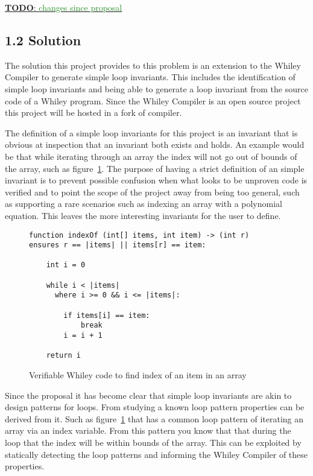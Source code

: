 \documentclass[11pt, a4paper, twoside, openright]{report}
\newcommand{\todo}[1]{\huge{\underline{\textbf{\textcolor{RubineRed}{TODO}}: \textcolor{ForestGreen}{#1}}}\normalsize }
\begin{document}
\todo{changes since proposal}

\subsection*{1.2 Solution}

The solution this project provides to this problem is an extension to
the Whiley Compiler to generate simple loop invariants.
This includes the identification of simple loop invariants and being able
to generate a loop invariant from the source code of a Whiley program.
Since the Whiley Compiler is an open source project this project will be
hosted in a fork of compiler.

The definition of a simple loop invariants for this project is an invariant that is
obvious at inspection that an invariant both exists and holds.
An example would be that while iterating through an array the index
will not go out of bounds of the array, such as figure~\ref{lst:whiley-ex-1}.
The purpose of having a strict definition of an simple invariant is to prevent
possible confusion when what looks to be unproven code is verified and to point
the scope of the project away from being too general, such as supporting
a rare scenarios such as indexing an array with a polynomial equation.
This leaves the more interesting invariants for the user to define.

\begin{figure}[ht]
\begin{lstlisting}
function indexOf (int[] items, int item) -> (int r)
ensures r == |items| || items[r] == item:

    int i = 0

    while i < |items|
      where i >= 0 && i <= |items|:

        if items[i] == item:
            break
        i = i + 1

    return i
\end{lstlisting}
\caption{Verifiable Whiley code to find index of an item in an array}
\label{lst:whiley-ex-1}
\end{figure}

Since the proposal it has become clear that simple loop invariants are
akin to design patterns for loops.
From studying a known loop pattern properties can be derived from it.
Such as figure~\ref{lst:whiley-ex-1} that has a common loop pattern of
iterating an array via an index variable.
From this pattern you know that that during the loop that the index will be
within bounds of the array.
This can be exploited by statically detecting the loop patterns and informing
the Whiley Compiler of these properties.
\end{document}
